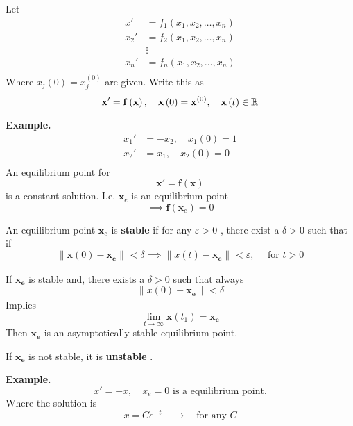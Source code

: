 \documentclass{article}
\theoremstyle{remark}
\begin{document}
Let \[
  \begin{split}
x'   & = f_1\left( x_{1} , x_{2} , \ldots , x_{n} \right) \\
x_{2}'  &=  f_{2}\left( x_{1}, x_{2} , \ldots , x_{n} \right) \\
 & \vdots  \\
x_{n}'  &=  f_{n}\left( x_{1}, x_{2} , \ldots , x_{n} \right) \\
  \end{split} 
\] 
Where $x_{j} \left( 0 \right) = x_{j}^{(0)}$ are given. Write this as \[
\mathbf{x} '  =  \mathbf{f}\left( \mathbf{x} \right), \quad  \mathbf{x}\left( 0 \right) = \mathbf{x}^{(0)}, \quad  \mathbf{x}\left( t  \right) \in \mathbb{R}    \\
\] 

\begin{tcolorbox}
  \textbf{Example.} \[
  \begin{split}
    x_{1}'  &=  -x_{2} , \quad  x_{1}\left( 0 \right) = 1   \\
    x_{2} ' &=  x_{1}, \quad  x_{2} \left( 0 \right) =  0   \\
  \end{split} 
  \] 
  An equilibrium point for \[
  \mathbf{x}'  = \mathbf{f}\left( \mathbf{x} \right) 
  \] 
  is a constant solution. I.e. $\mathbf{x}_{e}$ is an equilibrium point \[
  \implies  \mathbf{f}\left( \mathbf{x}_{e} \right) = 0
  \] 
\end{tcolorbox}

\begin{definition}
  An equilibrium point  $\mathbf{x}_{e}$ is \textbf{stable}  if for any $\varepsilon > 0 $ , there exist a $\delta  > 0$ such that if \[
  \|\mathbf{x}\left( 0 \right) - \mathbf{x_{e}}\|_{}^{ } < \delta  \implies  \|x\left( t \right) - \mathbf{x_{e}}\|_{}^{} < \varepsilon  , \quad  \text{ for } t > 0 
  \] 
\end{definition}


\begin{definition}
  If $\mathbf{x_{e}}$ is stable and, there exists a $\delta > 0 $ such that always \[
  \|x\left( 0 \right) - \mathbf{x_{e}}\|_{}^{} < \delta 
  \] 
  Implies \[
    \lim_{t\to \infty} \mathbf{x}\left( t_{1} \right) = \mathbf{x_{e}}
  \] 
  Then $\mathbf{x_{e}}$ is an asymptotically stable equilibrium point. 
  
  If $\mathbf{x_{e}}$ is not stable, it is  \textbf{unstable} .
\end{definition}

\begin{tcolorbox}
  \textbf{Example.}  \[
  x'  = -x , \quad  x_{e} = 0  \text{ is a equilibrium point.} 
  \] 
   Where the solution is \[
   x = C e^{-t} \quad  \to  \quad  \text{for any } C  
   \] 
\end{tcolorbox}
\end{document}
